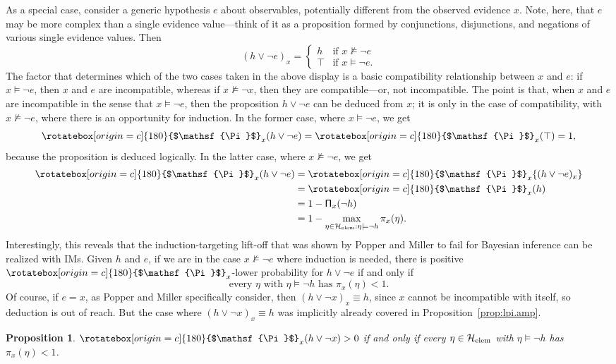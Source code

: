 \documentclass[a4paper, 12pt]{article}
\theoremstyle{plain}
\newtheorem{prop}{Proposition}
\theoremstyle{definition}
\theoremstyle{remark}
\renewcommand{\H}{\mathcal{H}}
\newcommand{\lPi}{\rotatebox[origin=c]{180}{$\mathsf{\Pi}$}} %
\newcommand{\uPi}{\mathsf{\Pi}}%
\begin{document}
As a special case, consider a generic hypothesis $e$ about observables, potentially different from the observed evidence $x$.  Note, here, that $e$ may be more complex than a single evidence value---think of it as a proposition formed by conjunctions, disjunctions, and negations of various single evidence values.  Then 
\[ (h \lor \neg e)_x = \begin{cases} h & \text{if $x \not\models \neg e$} \\ \top & \text{if $x \models \neg e$}. \end{cases} \]
The factor that determines which of the two cases taken in the above display is a basic compatibility relationship between $x$ and $e$: if $x \models \neg e$, then $x$ and $e$ are incompatible, whereas if $x \not\models \neg x$, then they are compatible---or, not incompatible.  The point is that, when $x$ and $e$ are incompatible in the sense that $x \models \neg e$, then the proposition $h \lor \neg e$ can be deduced from $x$; it is only in the case of compatibility, with $x \not\models \neg e$, where there is an opportunity for induction.  In the former case, where $x \models \neg e$, we get 
\[ \lPi_x(h \lor \neg e) = \lPi_x(\top) = 1, \]
because the proposition is deduced logically.  In the latter case, where $x \not\models \neg e$, we get 
\begin{align*}
\lPi_x(h \lor \neg e) & = \lPi_x\{ (h \lor \neg e)_x \} \\
& = \lPi_x(h) \\
& = 1 - \uPi_x(\neg h) \\
& = 1 - \max_{\eta \in \H_\text{elem}: \eta \models \neg h} \pi_x(\eta). 
\end{align*}
Interestingly, this reveals that the induction-targeting lift-off that was shown by Popper and Miller to fail for Bayesian inference can be realized with IMs.  Given $h$ and $e$, if we are in the case $x \not\models \neg e$ where induction is needed, there is positive $\lPi_x$-lower probability for $h \lor \neg e$ if and only if
\[ \text{every $\eta$ with $\eta \models \neg h$ has $\pi_x(\eta) < 1$}. \]
Of course, if $e = x$, as Popper and Miller specifically consider, then $(h \lor \neg x)_x \equiv h$, since $x$ cannot be incompatible with itself, so deduction is out of reach.  But the case where $(h \lor \neg x)_x \equiv h$ was implicitly already covered in Proposition~\ref{prop:lpi.amp}. 

\begin{prop}
\label{prop:pm}
$\lPi_x(h \lor \neg x) > 0$ if and only if every $\eta \in \H_\text{\rm elem}$ with $\eta \models \neg h$ has $\pi_x(\eta) < 1$.
\end{prop}
\end{document}
